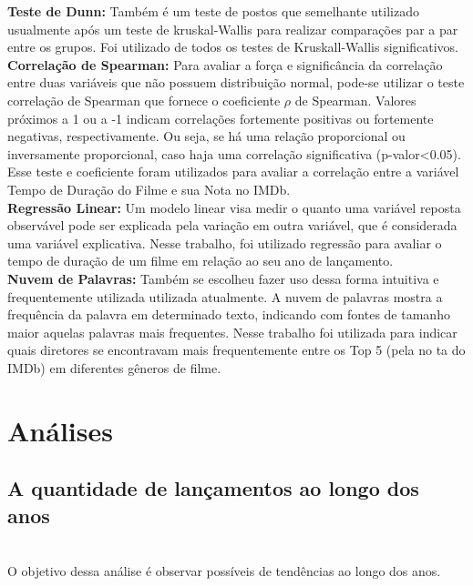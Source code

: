 \documentclass[a4paper, 12pt]{article} %
\begin{document}
\textbf{Teste de Dunn:} Também é um teste de postos que semelhante utilizado usualmente após um teste de kruskal-Wallis para realizar comparações par a par entre os grupos. Foi utilizado  de todos os testes de Kruskall-Wallis significativos.\\

\textbf{Correlação de Spearman:} Para avaliar a força e significância da correlação entre duas variáveis que não possuem distribuição normal, pode-se utilizar o teste correlação de Spearman que fornece o coeficiente $\rho$ de Spearman. Valores próximos a 1 ou a -1 indicam correlações fortemente positivas ou fortemente negativas, respectivamente. Ou seja, se há uma relação proporcional ou inversamente proporcional, caso haja uma correlação significativa (p-valor<0.05). Esse teste e coeficiente foram utilizados para avaliar a correlação entre a variável Tempo de Duração do Filme e sua Nota no IMDb. \\

\textbf{Regressão Linear:} Um modelo linear visa medir o quanto uma variável reposta observável pode ser explicada pela variação em outra variável, que é considerada uma variável explicativa. Nesse trabalho, foi utilizado regressão para avaliar o tempo de duração de um filme em relação ao seu ano de lançamento.\\

\textbf{Nuvem de Palavras:} Também se escolheu fazer uso dessa  forma intuitiva e frequentemente utilizada utilizada atualmente. A nuvem de palavras mostra a frequência da palavra em determinado texto, indicando com fontes de tamanho maior aquelas palavras mais frequentes. Nesse trabalho foi utilizada para indicar quais diretores se encontravam mais frequentemente entre os Top 5 (pela no ta do IMDb) em diferentes gêneros de filme.  \\



\section{Análises}

\subsection {A quantidade de lançamentos ao longo dos anos}\\

O objetivo dessa análise é observar possíveis de tendências ao longo dos anos. 
\end{document}
